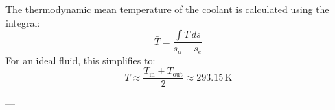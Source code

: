 The thermodynamic mean temperature of the coolant is calculated using the integral:  
\[
\bar{T} = \frac{\int T \, ds}{s_a - s_e}
\]  
For an ideal fluid, this simplifies to:  
\[
\bar{T} \approx \frac{T_{\text{in}} + T_{\text{out}}}{2} \approx 293.15 \, \text{K}
\]  

---